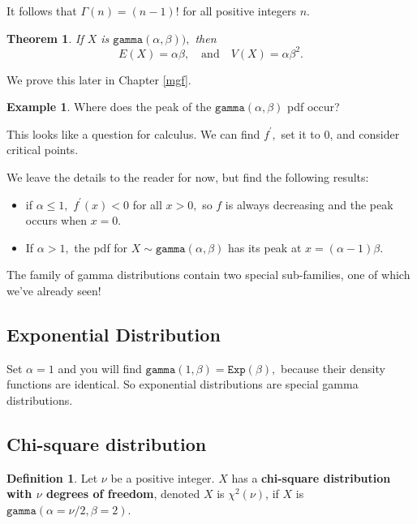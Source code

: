 \documentclass[
]{book}
\providecommand{\tightlist}{%
  \setlength{\itemsep}{0pt}\setlength{\parskip}{0pt}}
\newtheorem{theorem}{Theorem}[chapter]
\theoremstyle{definition}
\newtheorem{definition}{Definition}[chapter]
\theoremstyle{definition}
\newtheorem{example}{Example}[chapter]
\theoremstyle{definition}
\theoremstyle{definition}
\theoremstyle{remark}
\begin{document}
It follows that \(\Gamma(n) = (n-1)!\) for all positive integers \(n\).

\begin{theorem}
\protect\hypertarget{thm:gamma-EandV}{}\label{thm:gamma-EandV}If \(X\) is \(\texttt{gamma}(\alpha,\beta)),\) then \[E(X) = \alpha\beta, ~~~ \text{ and } ~~~ V(X) = \alpha\beta^2.\]
\end{theorem}

We prove this later in Chapter \ref{mgf}.

\begin{example}

Where does the peak of the \(\texttt{gamma}(\alpha,\beta)\) pdf occur?

This looks like a question for calculus. We can find \(f^\prime,\) set it to 0, and consider critical points.

We leave the details to the reader for now, but find the following results:

\begin{itemize}
\tightlist
\item
  if \(\alpha \leq 1,\) \(f^\prime(x) < 0\) for all \(x > 0,\) so \(f\) is always decreasing and the peak occurs when \(x = 0\).
\item
  If \(\alpha > 1,\) the pdf for \(X \sim \texttt{gamma}(\alpha, \beta)\) has its peak at \(x = (\alpha-1)\beta.\)
\end{itemize}

\end{example}

The family of gamma distributions contain two special sub-families, one of which we've already seen!

\subsection{Exponential Distribution}\label{exponential-distribution-1}

Set \(\alpha = 1\) and you will find \(\texttt{gamma}(1,\beta) = \texttt{Exp}(\beta),\)
because their density functions are identical. So exponential distributions are special gamma distributions.

\subsection{Chi-square distribution}\label{chi-square-distribution}

\begin{definition}
\protect\hypertarget{def:chi-square}{}\label{def:chi-square}Let \(\nu\) be a positive integer. \(X\) has a \textbf{chi-square distribution with \(\nu\) degrees of freedom}, denoted \(X\) is \(\chi^2(\nu)\), if \(X\) is \(\texttt{gamma}(\alpha = \nu/2, \beta = 2).\)
\end{definition}
\end{document}
